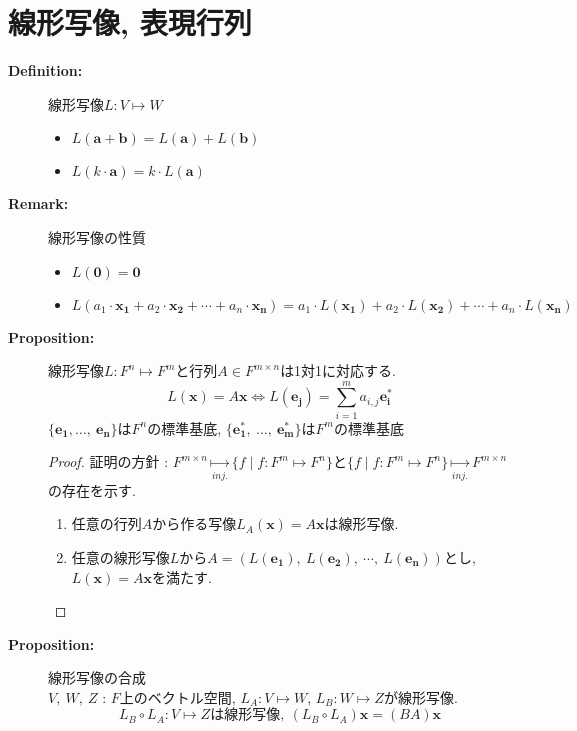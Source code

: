 \documentclass[dvipdfmx]{jsarticle}
\begin{document}
\section{線形写像, 表現行列}
\begin{description}
    \item[\bf{Definition:}] 線形写像$L : V \mapsto W$
        \begin{itemize}
            \item $L(\bm{a} + \bm{b}) = L(\bm{a}) + L(\bm{b})$
            \item $L(k \cdot \bm{a}) = k \cdot L(\bm{a})$
        \end{itemize}
    \item[\bf{Remark:}] 線形写像の性質
        \begin{itemize}
            \item $L(\bm{0}) = \bm{0}$
            \item $L(a_1 \cdot \bm{x_1} + a_2 \cdot \bm{x_2} + \cdots + a_n \cdot \bm{x_n}) = a_1 \cdot L(\bm{x_1}) + a_2 \cdot L(\bm{x_2}) + \cdots + a_n \cdot L(\bm{x_n})$
        \end{itemize}
    
    \item[\bf{Proposition:}] 線形写像$L : F^n \mapsto F^m$と行列$A \in F^{m \times n}$は1対1に対応する.
        $$ L(\bm{x}) = A \bm{x} \Leftrightarrow L(\bm{e_j}) = \sum_{i=1}^m a_{i,j} \bm{e^*_i} $$
        $ \{ \bm{e_1}, \dots ,\ \bm{e_n} \}$は$F^n$の標準基底, $ \{ \bm{e^*_1},\ \dots ,\ \bm{e^*_m} \}$は$F^m$の標準基底 \\
        \begin{proof} 証明の方針 : $F^{m \times n} \underset{inj.}{\mapsto} \{ f \mid f :F^m \mapsto F^n\}$と$\{ f \mid f :F^m \mapsto F^n\} \underset{inj.}{\mapsto} F^{m \times n}$の存在を示す.
            \begin{enumerate}
                \item 任意の行列$A$から作る写像$L_A(\bm{x}) = A\bm{x}$は線形写像.
                \item 任意の線形写像$L$から$A = ( L(\bm{e_1}),\ L(\bm{e_2}),\ \cdots,\ L(\bm{e_n}))$とし, $L(\bm{x}) = A\bm{x}$を満たす.
            \end{enumerate}
        \end{proof}
        
    \item[\bf{Proposition:}] 線形写像の合成 \\
        $V,\ W,\ Z$ : $F$上のベクトル空間, $L_A : V \mapsto W$, $L_B : W \mapsto Z$が線形写像.
        $$L_B \circ L_A : V \mapsto Z \text{は線形写像},\ (L_B \circ L_A) \bm{x} = (BA) \bm{x}$$
    

\end{description}
\end{document}
